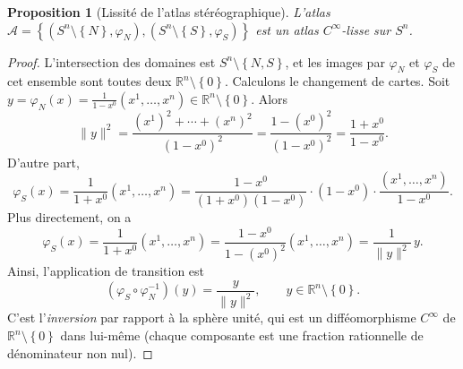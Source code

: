 \documentclass[12pt,a4paper,openany]{book}
\theoremstyle{definition}
\theoremstyle{plain}
\newtheorem{proposition}[definition]{Proposition}
\theoremstyle{remark}
\newcommand{\R}{\mathbb{R}}
\newcommand{\set}[1]{\left\{#1\right\}}
\begin{document}
\begin{center}
\end{center}

\begin{proposition}[Lissité de l'atlas stéréographique]\label{prop:atlas-stereo}
L'atlas $\mathcal{A} = \set{(S^n \setminus \set{N}, \varphi_N), (S^n \setminus
\set{S}, \varphi_S)}$ est un atlas $C^\infty$-lisse sur $S^n$.
\end{proposition}

\begin{proof}
L'intersection des domaines est $S^n \setminus \set{N, S}$, et les images par
$\varphi_N$ et $\varphi_S$ de cet ensemble sont toutes deux $\R^n \setminus
\set{0}$. Calculons le changement de cartes. Soit $y = \varphi_N(x) =
\frac{1}{1 - x^0}(x^1, \ldots, x^n) \in \R^n \setminus \set{0}$. Alors
\[
    \|y\|^2 = \frac{(x^1)^2 + \cdots + (x^n)^2}{(1 - x^0)^2}
    = \frac{1 - (x^0)^2}{(1 - x^0)^2} = \frac{1 + x^0}{1 - x^0}.
\]
D'autre part,
\[
    \varphi_S(x) = \frac{1}{1 + x^0}(x^1, \ldots, x^n)
    = \frac{1 - x^0}{(1 + x^0)(1 - x^0)} \cdot (1 - x^0) \cdot
    \frac{(x^1, \ldots, x^n)}{1 - x^0}.
\]
Plus directement, on a
\[
    \varphi_S(x) = \frac{1}{1 + x^0}(x^1, \ldots, x^n)
    = \frac{1 - x^0}{1 - (x^0)^2}(x^1, \ldots, x^n)
    = \frac{1}{\|y\|^2}\, y.
\]
Ainsi, l'application de transition est
\[
    (\varphi_S \circ \varphi_N^{-1})(y) = \frac{y}{\|y\|^2},
    \qquad y \in \R^n \setminus \set{0}.
\]
C'est l'\emph{inversion} par rapport à la sphère unité, qui
est un difféomorphisme $C^\infty$ de $\R^n \setminus \set{0}$ dans lui-même
(chaque composante est une fraction rationnelle de dénominateur non nul).
\end{proof}
\end{document}
